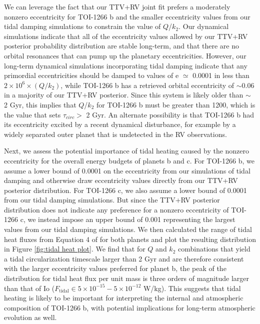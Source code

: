 \documentclass[twocolumn]{aastex631}
\begin{document}
We can leverage the fact that our TTV+RV joint fit prefers a moderately nonzero eccentricity for TOI-1266 b and the smaller eccentricity values from our tidal damping simulations to constrain the value of $Q$/$k_2$. Our dynamical simulations indicate that all of the eccentricity values allowed by our TTV+RV posterior probability distribution are stable long-term, and that there are no orbital resonances that can pump up the planetary eccentricities. However, our long-term dynamical simulations incorporating tidal damping indicate that any primordial eccentricities should be damped to values of e $\simeq$ 0.0001 in less than $2\times10^6\times(Q/k_2)$, while TOI-1266 b has a retrieved orbital eccentricity of $\sim0.06$ in a majority of our TTV+RV posterior. Since this system is likely older than $\sim$ 2 Gyr, this implies that $Q$/$k_2$ for TOI-1266 b must be greater than 1200, which is the value that sets $\tau_{circ} >$ 2 Gyr. An alternate possibility is that TOI-1266 b had its eccentricity excited by a recent dynamical disturbance, for example by a widely separated outer planet that is undetected in the RV observations. 

Next, we assess the potential importance of tidal heating caused by the nonzero eccentricity for the overall energy budgets of planets b and c. For TOI-1266 b, we assume a lower bound of 0.0001 on the eccentricity from our simulations of tidal damping and otherwise draw eccentricity values directly from our TTV+RV posterior distribution. For TOI-1266 c, we also assume a lower bound of 0.0001 from our tidal damping simulations. But since the TTV+RV posterior distribution does not indicate any preference for a nonzero eccentricity of TOI-1266 c, we instead impose an upper bound of 0.001 representing the largest values from our tidal damping simulations. We then calculated the range of tidal heat fluxes from Equation 4 of \cite{Jackson2008} for both planets and plot the resulting distribution in Figure \ref{fig:tidal heat plot}. We find that for $Q$ and $k_2$ combinations that yield a tidal circularization timescale larger than 2 Gyr and are therefore consistent with the larger eccentricity values preferred for planet b, the peak of the distribution for tidal heat flux per unit mass is three orders of magnitude larger than that of Io ($F_{\mathrm{tidal}} \in 5\times10^{-15} - 5\times10^{-12}$  W/kg). This suggests that tidal heating is likely to be important for interpreting the internal and atmospheric composition of TOI-1266 b, with potential implications for long-term atmospheric evolution as well. 
\end{document}
